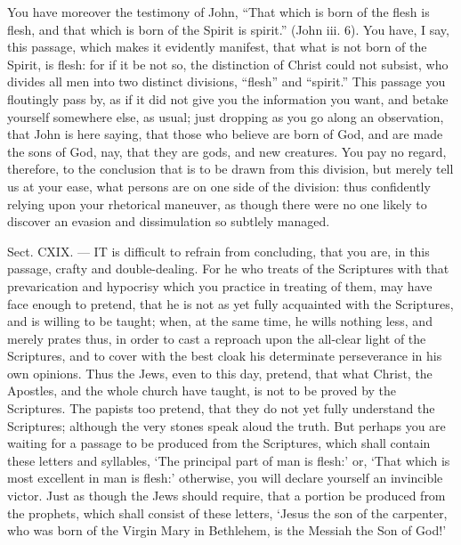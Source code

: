 You have moreover the testimony of John, “That which is born of the flesh is flesh, and that which is born of the Spirit is spirit.” (John iii. 6). You have, I say, this passage, which makes it evidently manifest, that what is not born of the Spirit, is flesh: for if it be not so, the distinction of Christ could not subsist, who divides all men into two distinct divisions, “flesh” and “spirit.” This passage you floutingly pass by, as if it did not give you the information you want, and betake yourself somewhere else, as usual; just dropping as you go along an observation, that John is here saying, that those who believe are born of God, and are made the sons of God, nay, that they are gods, and new creatures. You pay no regard, therefore, to the conclusion that is to be drawn from this division, but merely tell us at your ease, what persons are on one side of the division: thus confidently relying upon your rhetorical maneuver, as though there were no one likely to discover an evasion and dissimulation so subtlely managed.


Sect. CXIX. — IT is difficult to refrain from concluding, that you are, in this passage, crafty and double-dealing. For he who treats of the Scriptures with that prevarication and hypocrisy which you practice in treating of them, may have face enough to pretend, that he is not as yet fully acquainted with the Scriptures, and is willing to be taught; when, at the same time, he wills nothing less, and merely prates thus, in order to cast a reproach upon the all-clear light of the Scriptures, and to cover with the best cloak his determinate perseverance in his own opinions. Thus the Jews, even to this day, pretend, that what Christ, the Apostles, and the whole church have taught, is not to be proved by the Scriptures. The papists too pretend, that they do not yet fully understand the Scriptures; although the very stones speak aloud the truth. But perhaps you are waiting for a passage to be produced from the Scriptures, which shall contain these letters and syllables, ‘The principal part of man is flesh:’ or, ‘That which is most excellent in man is flesh:’ otherwise, you will declare yourself an invincible victor. Just as though the Jews should require, that a portion be produced from the prophets, which shall consist of these letters, ‘Jesus the son of the carpenter, who was born of the Virgin Mary in Bethlehem, is the Messiah the Son of God!’

